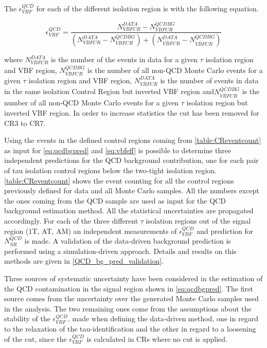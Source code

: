 The $\epsilon^{QCD}_{VBF}$ for each of the different \hadtau isolation region is with the following equation.

\begin{equation}
\epsilon^{QCD}_{VBF} = \frac {N^{DATA}_{VBF CR} - N^{\overline{QCD} BG}_{VBFCR}}{\left( N^{DATA}_{VBFCR} - N^{\overline{QCD} BG}_{VBFCR} \right) + \left( N^{DATA}_{\overline{VBF}CR} - N^{\overline{QCD} BG}_{\overline{VBF}CR} \right) }
\label{eq:vbfeff}
\end{equation}

where $N^{DATA}_{VBF CR}$ is the number of the events in data for a given $ \tau $ isolation region and VBF region, $N^{\overline{QCD} BG}_{VBFCR}$ is the number of all non-QCD Monte Carlo events for a given $ \tau $ isolation region and VBF region, $N^{DATA}_{\overline{VBF}CR}$ is the number of events in data in the same isolation Control Region but inverted VBF region and$N^{\overline{QCD} BG}_{\overline{VBF}CR}$ is the number of all non-QCD Monte Carlo events for a given $ \tau $ isolation region but inverted VBF region. In order to increase statistics the \met cut has been removed for CR3 to CR7.

Using the events in the defined control regions coming from \autoref{table:CReventcount} as input for \autoref{eq:qcdbgpred} and \autoref{eq:vbfeff} is possible to determine three independent predictions for the QCD background contribution, one for each pair of tau isolation control regions below the two-tight isolation region. \autoref{table:CReventcount} shows the event counting for all the control regions previously defined for data and all Monte Carlo samples. All the numbers except the ones coming from the QCD sample are used as input for the QCD background estimation method. All the statistical uncertainties are propagated accordingly.  For each of the three different $\tau$ isolation regions out of the signal region (1T, AT, AM) an independent measurements of $\epsilon^{QCD}_{VBF}$  and prediction for $N^{QCD}_{SR}$ is made. A validation of the data-driven background prediction is performed  using a simulation-driven approach. Details and results on this methods are given in \autoref{QCD_bg_pred_validation}.

Three sources of systematic uncertainty have been considered in the estimation of the QCD contamination in the signal region shown in \autoref{eq:qcdbgpred}. The first source comes from the uncertainty over the generated Monte Carlo samples used in the analysis. The two remaining ones come from the assumptions about the stability of the $\epsilon^{QCD}_{VBF}$, made when defining the data-driven method, one in regard to the relaxation of the tau-identification and the other in regard to a loosening of the \met cut, since the $\epsilon^{QCD}_{VBF}$ is calculated in CRs where no \met cut is applied.

